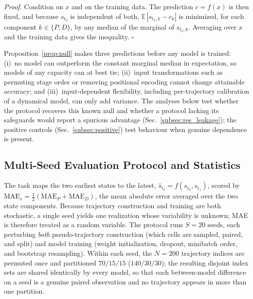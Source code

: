 \documentclass[10pt,journal,compsoc]{IEEEtran}
\begin{document}
\noindent\emph{Proof.} Condition on $x$ and on the training data. The prediction $c=f(x)$ is then fixed, and because $s_{t_2}$ is independent of both, $\mathbb{E}\,|s_{t_2,k}-c_k|$ is minimized, for each component $k\in\{P,D\}$, by any median of the marginal of $s_{t_2,k}$. Averaging over $x$ and the training data gives the inequality. $\square$

Proposition~\ref{prop:null} makes three predictions before any model is trained: (i)~no model can outperform the constant marginal median in expectation, so models of any capacity can at best tie; (ii)~input transformations such as permuting stage order or removing positional encoding cannot change attainable accuracy; and (iii)~input-dependent flexibility, including per-trajectory calibration of a dynamical model, can only add variance. The analyses below test whether the protocol recovers this known null and whether a protocol lacking its safeguards would report a spurious advantage (Sec.~\ref{subsec:res_leakage}); the positive controls (Sec.~\ref{subsec:positive}) test behaviour when genuine dependence is present.

\subsection{Multi-Seed Evaluation Protocol and Statistics}
\label{subsec:protocol}

The task maps the two earliest states to the latest, $\hat{s}_{t_2}=f(s_{t_0},s_{t_1})$, scored by $\mathrm{MAE}_s=\tfrac{1}{2}(\mathrm{MAE}_P+\mathrm{MAE}_D)$, the mean absolute error averaged over the two state components. Because trajectory construction and training are both stochastic, a single seed yields one realization whose variability is unknown; MAE is therefore treated as a random variable. The protocol runs $S=20$ seeds, each perturbing \emph{both} pseudo-trajectory construction (which cells are sampled, paired, and split) and model training (weight initialization, dropout, minibatch order, and bootstrap resampling). Within each seed, the $N=200$ trajectory indices are permuted once and partitioned $70/15/15$ ($140/30/30$); the resulting disjoint index sets are shared identically by every model, so that each between-model difference on a seed is a genuine paired observation and no trajectory appears in more than one partition.
\end{document}
